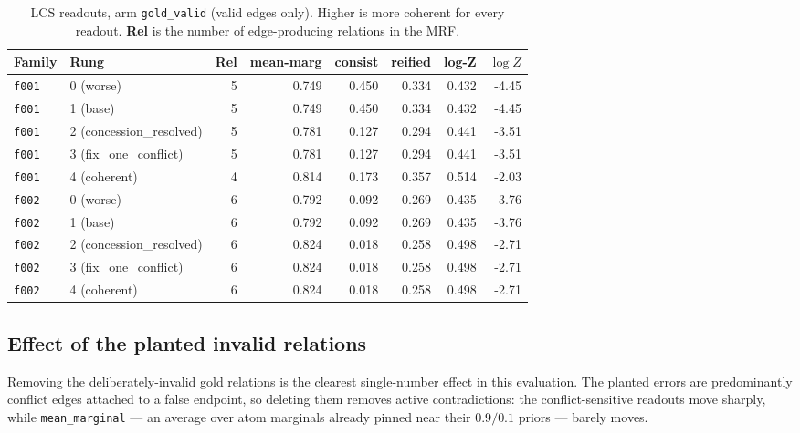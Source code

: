 \documentclass[11pt]{article}
\begin{document}
\begin{table}[htbp]
\centering
\small
\caption{LCS readouts, arm \texttt{gold\_valid} (valid edges only). Higher is more coherent for every readout. \textbf{Rel} is the number of edge-producing relations in the MRF.}
\label{tab:scores-gold-valid}
\begin{tabular}{llrrrrrr}
\toprule
Family & Rung & Rel & \textbf{mean-marg} & \textbf{consist} & \textbf{reified} & \textbf{log-Z} & $\log Z$ \\
\midrule
\texttt{f001} & 0 (worse) & 5 & 0.749 & 0.450 & 0.334 & 0.432 & -4.45 \\
\texttt{f001} & 1 (base) & 5 & 0.749 & 0.450 & 0.334 & 0.432 & -4.45 \\
\texttt{f001} & 2 (concession\_resolved) & 5 & 0.781 & 0.127 & 0.294 & 0.441 & -3.51 \\
\texttt{f001} & 3 (fix\_one\_conflict) & 5 & 0.781 & 0.127 & 0.294 & 0.441 & -3.51 \\
\texttt{f001} & 4 (coherent) & 4 & 0.814 & 0.173 & 0.357 & 0.514 & -2.03 \\
\midrule
\texttt{f002} & 0 (worse) & 6 & 0.792 & 0.092 & 0.269 & 0.435 & -3.76 \\
\texttt{f002} & 1 (base) & 6 & 0.792 & 0.092 & 0.269 & 0.435 & -3.76 \\
\texttt{f002} & 2 (concession\_resolved) & 6 & 0.824 & 0.018 & 0.258 & 0.498 & -2.71 \\
\texttt{f002} & 3 (fix\_one\_conflict) & 6 & 0.824 & 0.018 & 0.258 & 0.498 & -2.71 \\
\texttt{f002} & 4 (coherent) & 6 & 0.824 & 0.018 & 0.258 & 0.498 & -2.71 \\
\bottomrule
\end{tabular}
\end{table}

\subsection{Effect of the planted invalid relations}

Removing the deliberately-invalid gold relations is the clearest single-number effect in this evaluation. The planted errors are predominantly conflict edges attached to a false endpoint, so deleting them removes active contradictions: the conflict-sensitive readouts move sharply, while \texttt{mean\_marginal} --- an average over atom marginals already pinned near their $0.9/0.1$ priors --- barely moves.
\end{document}
